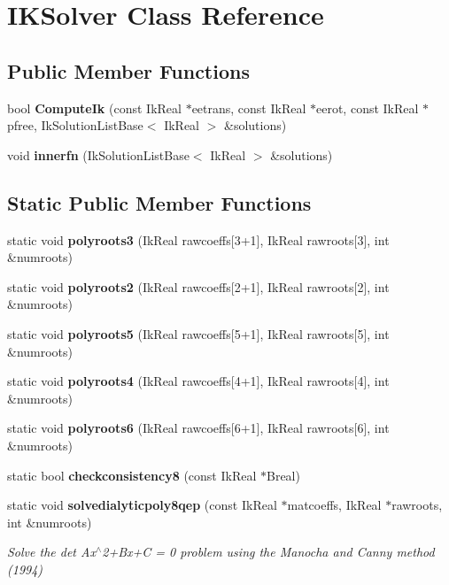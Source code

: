 \section{I\-K\-Solver Class Reference}
\label{class_i_k_solver}
\subsection*{Public Member Functions}
\begin{DoxyCompactItemize}
\item 
bool {\bfseries Compute\-Ik} (const Ik\-Real $\ast$eetrans, const Ik\-Real $\ast$eerot, const Ik\-Real $\ast$pfree, Ik\-Solution\-List\-Base$<$ Ik\-Real $>$ \&solutions)\label{class_i_k_solver_ac0195e291bed491b4cb6a68db8199b55}

\item 
void {\bfseries innerfn} (Ik\-Solution\-List\-Base$<$ Ik\-Real $>$ \&solutions)\label{class_i_k_solver_a5052994576b6519164e978e851c3237c}

\end{DoxyCompactItemize}
\subsection*{Static Public Member Functions}
\begin{DoxyCompactItemize}
\item 
static void {\bfseries polyroots3} (Ik\-Real rawcoeffs[3+1], Ik\-Real rawroots[3], int \&numroots)\label{class_i_k_solver_a46a898ea503f9399df84df127f7f84eb}

\item 
static void {\bfseries polyroots2} (Ik\-Real rawcoeffs[2+1], Ik\-Real rawroots[2], int \&numroots)\label{class_i_k_solver_a16a33b8d7de25af06070fb7c55e80bb1}

\item 
static void {\bfseries polyroots5} (Ik\-Real rawcoeffs[5+1], Ik\-Real rawroots[5], int \&numroots)\label{class_i_k_solver_af7c3645579c9598e04c140915d85742c}

\item 
static void {\bfseries polyroots4} (Ik\-Real rawcoeffs[4+1], Ik\-Real rawroots[4], int \&numroots)\label{class_i_k_solver_a771ebe9dbd8593520e8aab200e3c141a}

\item 
static void {\bfseries polyroots6} (Ik\-Real rawcoeffs[6+1], Ik\-Real rawroots[6], int \&numroots)\label{class_i_k_solver_a22e3d8d4252075c8b7096f5dacf86119}

\item 
static bool {\bfseries checkconsistency8} (const Ik\-Real $\ast$Breal)\label{class_i_k_solver_abecf6ea0c9933661bd0f3caeb0561881}

\item 
static void {\bf solvedialyticpoly8qep} (const Ik\-Real $\ast$matcoeffs, Ik\-Real $\ast$rawroots, int \&numroots)
\begin{DoxyCompactList}\small\item\em Solve the det Ax$^\wedge$2+\-Bx+\-C = 0 problem using the Manocha and Canny method (1994) \end{DoxyCompactList}\end{DoxyCompactItemize}
